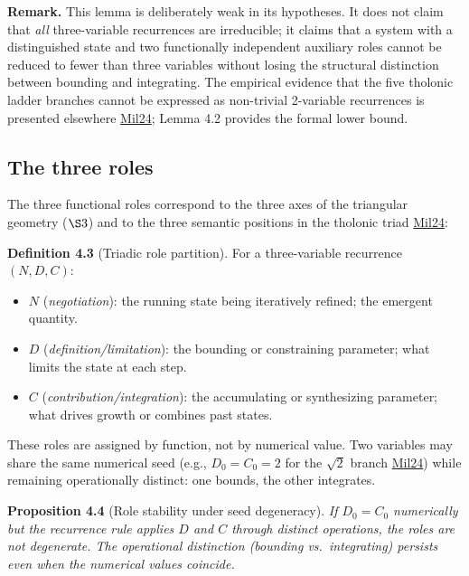 \documentclass[12pt]{article}
\providecommand{\tightlist}{%
  \setlength{\itemsep}{0pt}\setlength{\parskip}{0pt}}
\begin{document}
\textbf{Remark.} This lemma is deliberately weak in its hypotheses. It
does not claim that \emph{all} three-variable recurrences are
irreducible; it claims that a system with a distinguished state and two
functionally independent auxiliary roles cannot be reduced to fewer than
three variables without losing the structural distinction between
bounding and integrating. The empirical evidence that the five tholonic
ladder branches cannot be expressed as non-trivial 2-variable
recurrences is presented elsewhere
\href{https://tholonia.github.io/the-book/}{Mil24}; Lemma 4.2 provides
the formal lower bound.

\subsection{The three roles}\label{the-three-roles}

The three functional roles correspond to the three axes of the
triangular geometry (\(\S 3\)) and to the three semantic positions in
the tholonic triad \href{https://tholonia.github.io/the-book/}{Mil24}:

\textbf{Definition 4.3} (Triadic role partition). For a three-variable
recurrence \((N, D, C)\):

\begin{itemize}
\tightlist
\item
  \(N\) (\emph{negotiation}): the running state being iteratively
  refined; the emergent quantity.
\item
  \(D\) (\emph{definition/limitation}): the bounding or constraining
  parameter; what limits the state at each step.
\item
  \(C\) (\emph{contribution/integration}): the accumulating or
  synthesizing parameter; what drives growth or combines past states.
\end{itemize}

These roles are assigned by function, not by numerical value. Two
variables may share the same numerical seed (e.g., \(D_0 = C_0 = 2\) for
the \(\sqrt{2}\) branch
\href{https://tholonia.github.io/the-book/}{Mil24}) while remaining
operationally distinct: one bounds, the other integrates.

\textbf{Proposition 4.4} (Role stability under seed degeneracy).
\emph{If \(D_0 = C_0\) numerically but the recurrence rule applies \(D\)
and \(C\) through distinct operations, the roles are not degenerate. The
operational distinction (bounding vs.~integrating) persists even when
the numerical values coincide.}
\end{document}
